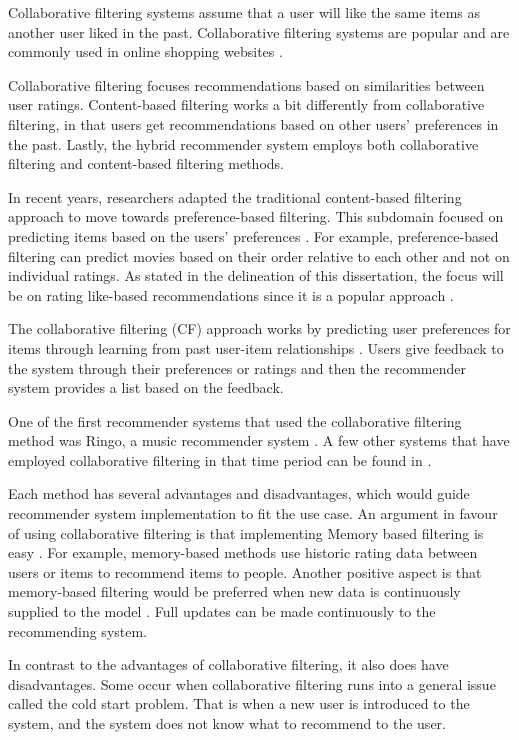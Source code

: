 Collaborative filtering systems assume that a user will like the same items as another user liked in the past. Collaborative filtering systems are popular and are commonly used in online shopping websites \cite{Nilashi20161}.

Collaborative filtering focuses recommendations based on similarities between user ratings. Content-based filtering works a bit differently from collaborative filtering, in that users get recommendations based on other users’ preferences in the past. Lastly, the hybrid recommender system employs both collaborative filtering and content-based filtering methods.

In recent years, researchers adapted the traditional content-based filtering approach to move towards preference-based filtering. This subdomain focused on predicting items based on the users’ preferences \cite{william1999learning,freund2003efficient,jin2002preference,jin2003collaborative}. For example, preference-based filtering can predict movies based on their order relative to each other and not on individual ratings. As stated in the delineation of this dissertation, the focus will be on rating like-based recommendations since it is a popular approach \cite{park2012literature}.

The collaborative filtering (CF) approach works by predicting user preferences for items through learning from past user-item relationships \cite{celma2008new}. Users give feedback to the system through their preferences or ratings and then the recommender system provides a list based on the feedback.

One of the first recommender systems that used the collaborative filtering method was Ringo, a music recommender system \cite{shardanand1995social}. A few other systems that have employed collaborative filtering in that time period can be found in .

Each method has several advantages and disadvantages, which would guide recommender system implementation to fit the use case.
An argument in favour of using collaborative filtering is that implementing Memory based filtering is easy \cite{Girase}. For example, memory-based methods use historic rating data between users or items to recommend items to people. Another positive aspect is that memory-based filtering would be preferred when new data is continuously supplied to the model \cite{jannach2010recommender}. Full updates can be made  continuously to the recommending system.

In contrast to the advantages of collaborative filtering, it also does have disadvantages. Some occur when collaborative filtering runs into a general issue called the cold start problem. That is when a new user is introduced to the system, and the system does not know what to recommend to the user.

